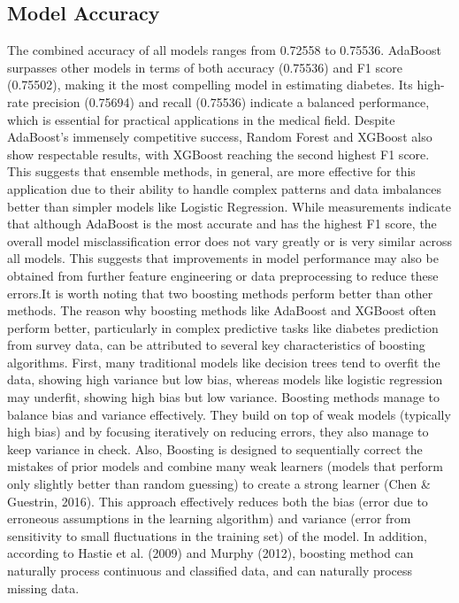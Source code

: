 \documentclass[12pt]{article}
\begin{document}
\subsection{Model Accuracy}
The combined accuracy of all models ranges from 0.72558 to 0.75536. AdaBoost surpasses other models in terms of both accuracy (0.75536) and F1 score (0.75502), making it the most compelling model in estimating diabetes. Its high-rate precision (0.75694) and recall (0.75536) indicate a balanced performance, which is essential for practical applications in the medical field. Despite AdaBoost's immensely competitive success, Random Forest and XGBoost also show respectable results, with XGBoost reaching the second highest F1 score. This suggests that ensemble methods, in general, are more effective for this application due to their ability to handle complex patterns and data imbalances better than simpler models like Logistic Regression. While measurements indicate that although AdaBoost is the most accurate and has the highest F1 score, the overall model misclassification error does not vary greatly or is very similar across all models. This suggests that improvements in model performance may also be obtained from further feature engineering or data preprocessing to reduce these errors.It is worth noting that two boosting methods perform better than other methods. The reason why boosting methods like AdaBoost and XGBoost often perform better, particularly in complex predictive tasks like diabetes prediction from survey data, can be attributed to several key characteristics of boosting algorithms. First, many traditional models like decision trees tend to overfit the data, showing high variance but low bias, whereas models like logistic regression may underfit, showing high bias but low variance. Boosting methods manage to balance bias and variance effectively. They build on top of weak models (typically high bias) and by focusing iteratively on reducing errors, they also manage to keep variance in check. Also, Boosting is designed to sequentially correct the mistakes of prior models and combine many weak learners (models that perform only slightly better than random guessing) to create a strong learner (Chen \& Guestrin, 2016). This approach effectively reduces both the bias (error due to erroneous assumptions in the learning algorithm) and variance (error from sensitivity to small fluctuations in the training set) of the model. In addition, according to Hastie et al. (2009) and Murphy (2012), boosting method can naturally process continuous and classified data, and can naturally process missing data. 
\end{document}
